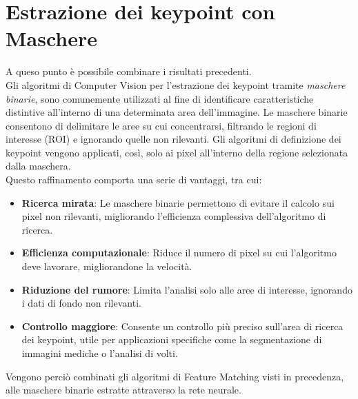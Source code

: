 \documentclass[12pt,a4paper,openright,twoside]{book}
\begin{document}
\section{Estrazione dei keypoint con Maschere}
A queso punto è possibile combinare i risultati precedenti.\\
Gli algoritmi di Computer Vision per l'estrazione dei keypoint tramite {\itshape maschere binarie}, sono comunemente utilizzati al fine di identificare caratteristiche distintive all'interno di una determinata area dell'immagine. Le maschere binarie consentono di delimitare le aree su cui concentrarsi, filtrando le regioni di interesse (ROI) e ignorando quelle non rilevanti. Gli algoritmi di definizione dei keypoint vengono applicati, così, solo ai pixel all'interno della regione selezionata dalla maschera.\\
Questo raffinamento comporta una serie di vantaggi, tra cui:
\begin{itemize}
\item \textbf{Ricerca mirata}: Le maschere binarie permettono di evitare il calcolo sui pixel non rilevanti, migliorando l’efficienza complessiva dell'algoritmo di ricerca.
\item \textbf{Efficienza computazionale}: Riduce il numero di pixel su cui l'algoritmo deve lavorare, migliorandone la velocità.
\item \textbf{Riduzione del rumore}: Limita l’analisi solo alle aree di interesse, ignorando i dati di fondo non rilevanti.
\item \textbf{Controllo maggiore}: Consente un controllo più preciso sull'area di ricerca dei keypoint, utile per applicazioni specifiche come la segmentazione di immagini mediche o l'analisi di volti.
\end{itemize}

Vengono perciò combinati gli algoritmi di Feature Matching visti in precedenza, alle maschere binarie estratte attraverso la rete neurale.\\
\end{document}
